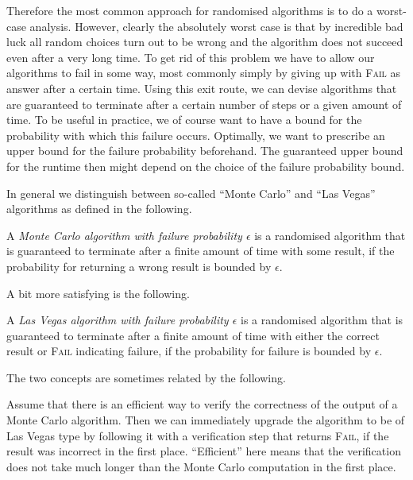Therefore the most common approach for randomised algorithms is to do a 
worst-case analysis. However, clearly the absolutely worst case is
that by incredible bad luck all random choices turn out to be wrong
and the algorithm does not succeed even after a very long time. To get
rid of this problem we have to allow our algorithms to fail in some
way, most commonly simply by giving up with \textsc{Fail} as answer
after a certain time.
Using this exit route, we can devise algorithms that are
guaranteed to terminate after a certain number of steps or a given
amount of time. To be useful in practice, we of course want to have a
bound for the probability with which this failure occurs. Optimally, we
want to prescribe an upper bound for the failure probability
beforehand. The guaranteed upper bound for the runtime then might
depend on the choice of the failure probability bound.

In general we distinguish between so-called ``Monte Carlo'' and
``Las Vegas'' algorithms as defined in the following.

\begin{Def}
%
%
    A \emph{Monte Carlo algorithm with failure probability $\epsilon$}
    is a randomised algorithm that is guaranteed to terminate after
    a finite amount of time with some result, if the probability for
    returning a wrong result is bounded by $\epsilon$.
\end{Def}

A bit more satisfying is the following.

\begin{Def}
%
%
    A \emph{Las Vegas algorithm with failure probability $\epsilon$}
    is a randomised algorithm that is guaranteed to terminate after
    a finite amount of time with either the correct result or
    \textsc{Fail} indicating failure, if the probability for failure
    is bounded by $\epsilon$.
\end{Def}

The two concepts are sometimes related by the following.

\begin{Rem}
%

Assume that there is an efficient way to verify the correctness of the output
of a Monte Carlo algorithm. Then we can immediately upgrade the
algorithm to be of Las Vegas type by following it with a verification
step that returns \textsc{Fail}, if the result was incorrect in the first
place. ``Efficient'' here means that the verification does not take
much longer than the Monte Carlo computation in the first place.
\end{Rem}

